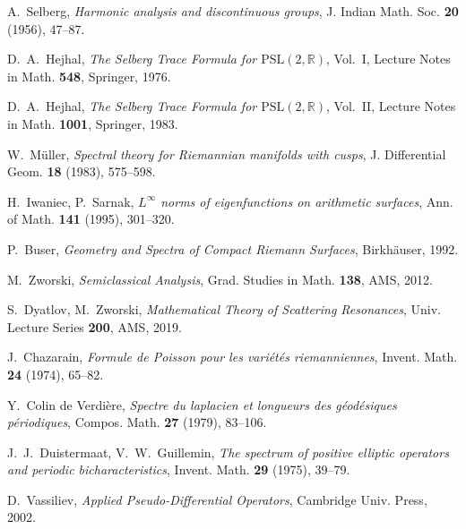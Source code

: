 \documentclass[12pt]{amsart}
\numberwithin{equation}{section}
\theoremstyle{plain}
\theoremstyle{definition}
\theoremstyle{remark}
\begin{document}
\begin{thebibliography}{99}

A.~Selberg,
\textit{Harmonic analysis and discontinuous groups},
J. Indian Math. Soc. \textbf{20} (1956), 47--87.

D.~A.~Hejhal,
\textit{The Selberg Trace Formula for $\mathrm{PSL}(2,\mathbb{R})$}, Vol.~I,
Lecture Notes in Math. \textbf{548}, Springer, 1976.

D.~A.~Hejhal,
\textit{The Selberg Trace Formula for $\mathrm{PSL}(2,\mathbb{R})$}, Vol.~II,
Lecture Notes in Math. \textbf{1001}, Springer, 1983.

W.~M\"uller,
\textit{Spectral theory for Riemannian manifolds with cusps},
J. Differential Geom. \textbf{18} (1983), 575--598.

H.~Iwaniec, P.~Sarnak,
\textit{$L^\infty$ norms of eigenfunctions on arithmetic surfaces},
Ann. of Math. \textbf{141} (1995), 301--320.

P.~Buser,
\textit{Geometry and Spectra of Compact Riemann Surfaces},
Birkh\"auser, 1992.

M.~Zworski,
\textit{Semiclassical Analysis},
Grad. Studies in Math. \textbf{138}, AMS, 2012.

S.~Dyatlov, M.~Zworski,
\textit{Mathematical Theory of Scattering Resonances},
Univ. Lecture Series \textbf{200}, AMS, 2019.

J.~Chazarain,
\textit{Formule de Poisson pour les vari\'et\'es riemanniennes},
Invent. Math. \textbf{24} (1974), 65--82.

Y.~Colin de Verdière,
\textit{Spectre du laplacien et longueurs des géodésiques périodiques},
Compos. Math. \textbf{27} (1979), 83--106.

J.~J.~Duistermaat, V.~W.~Guillemin,
\textit{The spectrum of positive elliptic operators and periodic bicharacteristics},
Invent. Math. \textbf{29} (1975), 39--79.

D.~Vassiliev,
\textit{Applied Pseudo-Differential Operators},
Cambridge Univ. Press, 2002.


\end{thebibliography}
\end{document}
